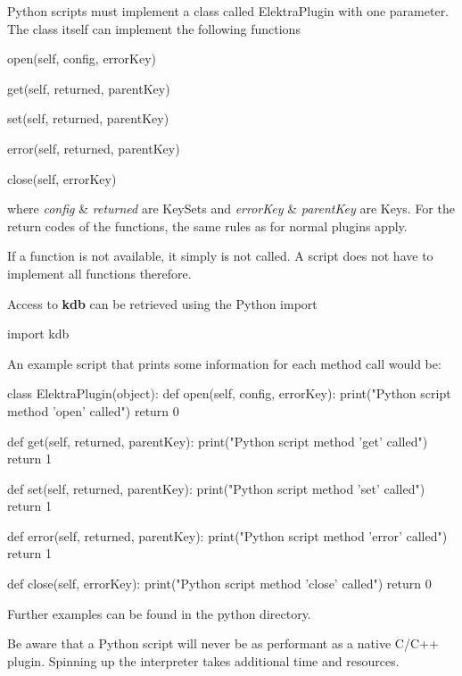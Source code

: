 Python scripts must implement a class called {\ttfamily Elektra\+Plugin} with one parameter. The class itself can implement the following functions


\begin{DoxyItemize}
\item open(self, config, error\+Key)
\item get(self, returned, parent\+Key)
\item set(self, returned, parent\+Key)
\item error(self, returned, parent\+Key)
\item close(self, error\+Key)
\end{DoxyItemize}

where {\itshape config} \& {\itshape returned} are Key\+Sets and {\itshape error\+Key} \& {\itshape parent\+Key} are Keys. For the return codes of the functions, the same rules as for normal plugins apply.

If a function is not available, it simply is not called. A script does not have to implement all functions therefore.

Access to {\bfseries kdb} can be retrieved using the Python import


\begin{DoxyCode}
\textcolor{keyword}{import} kdb
\end{DoxyCode}


An example script that prints some information for each method call would be\+:


\begin{DoxyCode}
\textcolor{keyword}{class }ElektraPlugin(object):
    \textcolor{keyword}{def }open(self, config, errorKey):
        print(\textcolor{stringliteral}{"Python script method 'open' called"})
        \textcolor{keywordflow}{return} 0

    \textcolor{keyword}{def }get(self, returned, parentKey):
        print(\textcolor{stringliteral}{"Python script method 'get' called"})
        \textcolor{keywordflow}{return} 1

    \textcolor{keyword}{def }set(self, returned, parentKey):
        print(\textcolor{stringliteral}{"Python script method 'set' called"})
        \textcolor{keywordflow}{return} 1

    \textcolor{keyword}{def }error(self, returned, parentKey):
        print(\textcolor{stringliteral}{"Python script method 'error' called"})
        \textcolor{keywordflow}{return} 1

    \textcolor{keyword}{def }close(self, errorKey):
        print(\textcolor{stringliteral}{"Python script method 'close' called"})
        \textcolor{keywordflow}{return} 0
\end{DoxyCode}


Further examples can be found in the python directory.

Be aware that a Python script will never be as performant as a native C/\+C++ plugin. Spinning up the interpreter takes additional time and resources. 